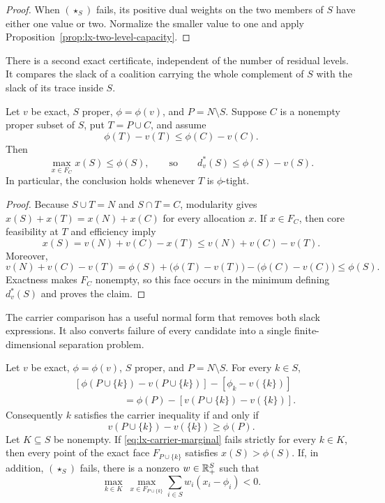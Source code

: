 \begin{proof}
When $(\star_S)$ fails, its positive dual weights on the two members of $S$
have either one value or two.  Normalize the smaller value to one and apply
Proposition~\ref{prop:lx-two-level-capacity}.
\end{proof}

There is a second exact certificate, independent of the number of residual
levels.  It compares the slack of a coalition carrying the whole complement
of $S$ with the slack of its trace inside $S$.

\begin{proposition}
\label{prop:lx-carrier-capacity}
Let $v$ be exact, $S$ proper, $\phi=\phi(v)$, and $P=N\setminus S$.
Suppose $C$ is a nonempty proper subset of $S$, put $T=P\cup C$, and assume
\[
 \phi(T)-v(T)\leq\phi(C)-v(C).
\]
Then
\[
 \max_{x\in F_C}x(S)\leq\phi(S),
 \qquad\text{so}\qquad
 d_v^*(S)\leq\phi(S)-v(S).
\]
In particular, the conclusion holds whenever $T$ is $\phi$-tight.
\end{proposition}

\begin{proof}
Because $S\cup T=N$ and $S\cap T=C$, modularity gives
$x(S)+x(T)=x(N)+x(C)$ for every allocation $x$.  If $x\in F_C$, then
core feasibility at $T$ and efficiency imply
\[
 x(S)=v(N)+v(C)-x(T)
 \leq v(N)+v(C)-v(T).
\]
Moreover,
\[
 v(N)+v(C)-v(T)
 =\phi(S)+\bigl(\phi(T)-v(T)\bigr)
              -\bigl(\phi(C)-v(C)\bigr)
 \leq\phi(S).
\]
Exactness makes $F_C$ nonempty, so this face occurs in the minimum defining
$d_v^*(S)$ and proves the claim.
\end{proof}

The carrier comparison has a useful normal form that removes both slack
expressions.  It also converts failure of every candidate into a single
finite-dimensional separation problem.

\begin{proposition}
\label{prop:lx-carrier-separation}
Let $v$ be exact, $\phi=\phi(v)$, $S$ proper, and $P=N\setminus S$.
For every $k\in S$,
\[
 \begin{split}
 &[\phi(P\cup\{k\})-v(P\cup\{k\})]
   -[\phi_k-v(\{k\})]\\
 &\hspace{5em}=\phi(P)-[v(P\cup\{k\})-v(\{k\})].
 \end{split}
\]
Consequently $k$ satisfies the carrier inequality if and only if
\[
 v(P\cup\{k\})-v(\{k\})\geq\phi(P).
 \tag{M}\label{eq:lx-carrier-marginal}
\]
Let $K\subseteq S$ be nonempty.  If \eqref{eq:lx-carrier-marginal} fails
strictly for every $k\in K$, then every point of the exact face
$F_{P\cup\{k\}}$ satisfies $x(S)>\phi(S)$.  If, in addition,
$(\star_S)$ fails, there is a nonzero $w\in\mathbb{R}^S_+$ such that
\[
 \max_{k\in K}\ \max_{x\in F_{P\cup\{k\}}}
       \sum_{i\in S}w_i(x_i-\phi_i)<0.
 \tag{Sep}\label{eq:lx-carrier-separator}
\]
\end{proposition}

